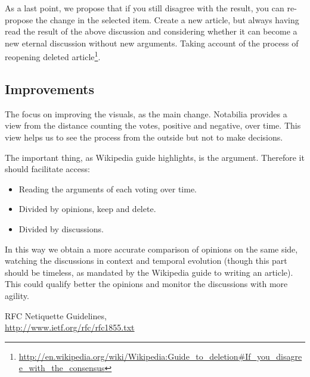 \documentclass[11pt]{scrartcl}
\begin{document}
\par As a last point, we propose that if you still disagree with the result, you can re-propose the change in the selected item. Create a new article, but always having read the result of the above discussion and considering whether it can become a new eternal discussion without new arguments. Taking account of the process of reopening deleted article\footnote{\url{http://en.wikipedia.org/wiki/Wikipedia:Guide_to_deletion\#If_you_disagree_with_the_consensus}}.


\subsection{Improvements}
\label{sub:improvements}

\par The focus on improving the visuals, as the main change. Notabilia provides a view from the distance counting the votes, positive and negative, over time. This view helps us to see the process from the outside but not to make decisions.

\par The important thing, as Wikipedia guide highlights, is the argument. Therefore it should facilitate access:

\begin{itemize}
	\item Reading the arguments of each voting over time.
	\item Divided by opinions, keep and delete.
	\item Divided by discussions.
\end{itemize}

\par In this way we obtain a more accurate comparison of opinions on the same side, watching the discussions in context and temporal evolution (though this part should be timeless, as mandated by the Wikipedia guide to writing an article). This could qualify better the opinions and monitor the discussions with more agility.

\begin{thebibliography}{9}

    RFC Netiquette Guidelines,\\
    \url{http://www.ietf.org/rfc/rfc1855.txt}

\end{thebibliography}
\end{document}

